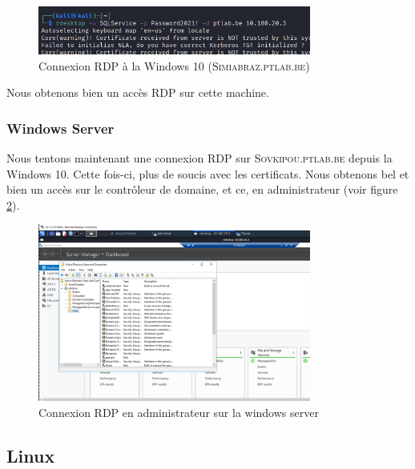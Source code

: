 \documentclass[a4paper]{article}
\begin{document}
\begin{figure}[H]
    \centering
    \includegraphics[width=0.8\textwidth]{images/lab4/rdptowin.PNG}
    \caption{Connexion RDP à la Windows 10 (\textsc{Simiabraz.ptlab.be})}
    \label{fig:rdptowin}
\end{figure}

Nous obtenons bien un accès RDP sur cette machine.

\subsubsection{Windows Server}
Nous tentons maintenant une connexion RDP sur \textsc{Sovkipou.ptlab.be} depuis la Windows 10. Cette fois-ci, plus de soucis avec les certificats. Nous obtenons bel et bien un accès sur le contrôleur de domaine, et ce, en administrateur (voir figure \ref{fig:admintoserv}).


\begin{figure}[H]
    \centering
    \includegraphics[width=0.8\textwidth]{images/lab4/admintoserv.PNG}
    \caption{Connexion RDP en administrateur sur la windows server}
    \label{fig:admintoserv}
\end{figure}









\subsection{Linux}\label{sec:linuxmdp}
\end{document}
